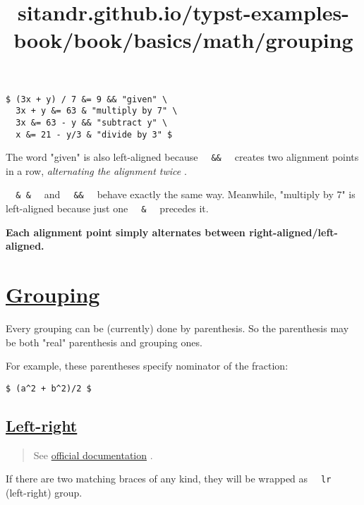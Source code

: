 \begin{verbatim}
$ (3x + y) / 7 &= 9 && "given" \
  3x + y &= 63 & "multiply by 7" \
  3x &= 63 - y && "subtract y" \
  x &= 21 - y/3 & "divide by 3" $
\end{verbatim}

\pandocbounded{}

The word "given" is also left-aligned because
\texttt{\ }{\texttt{\ \&\&\ }}\texttt{\ } creates two alignment points
in a row, \emph{alternating the alignment twice} .

\texttt{\ }{\texttt{\ \&\ \&\ }}\texttt{\ } and
\texttt{\ }{\texttt{\ \&\&\ }}\texttt{\ } behave exactly the same way.
Meanwhile, "multiply by 7" is left-aligned because just one
\texttt{\ }{\texttt{\ \&\ }}\texttt{\ } precedes it.

\textbf{Each alignment point simply alternates between
right-aligned/left-aligned.}


\title{sitandr.github.io/typst-examples-book/book/basics/math/grouping}

\section{\texorpdfstring{\hyperref[grouping]{Grouping}}{Grouping}}\label{grouping}

Every grouping can be (currently) done by parenthesis. So the
parenthesis may be both "real" parenthesis and grouping ones.

For example, these parentheses specify nominator of the fraction:

\begin{verbatim}
$ (a^2 + b^2)/2 $
\end{verbatim}

\pandocbounded{}

\subsection{\texorpdfstring{\hyperref[left-right]{Left-right}}{Left-right}}\label{left-right}

\begin{quote}
See \href{https://typst.app/docs/reference/math/lr}{official
documentation} .
\end{quote}

If there are two matching braces of any kind, they will be wrapped as
\texttt{\ }{\texttt{\ lr\ }}\texttt{\ } (left-right) group.

